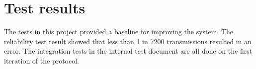 \section{Test results}
The tests in this project provided a baseline for improving the system. The reliability test result showed that less than 1 in 7200 transmissions resulted in an error. The integration tests in the internal test document are all done on the first iteration of the protocol. 



